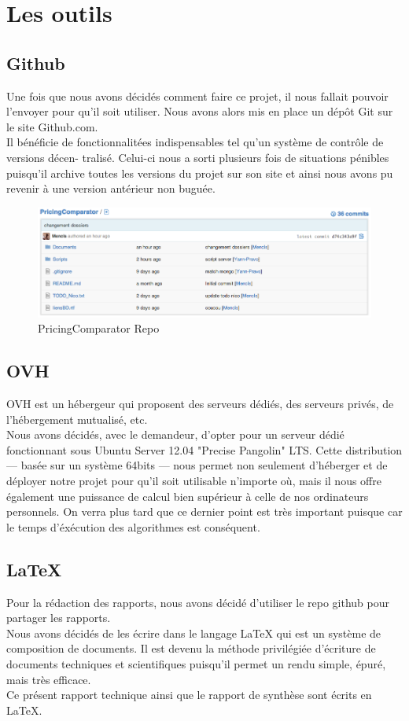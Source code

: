 \documentclass{report}
\begin{document}
\section{Les outils}
\subsection{Github}
Une fois que nous avons décidés comment faire ce projet, il nous fallait pouvoir l’envoyer pour qu’il soit utiliser. Nous avons alors mis en place un dépôt Git sur le site Github.com. \\
Il bénéficie de fonctionnalitées indispensables tel qu’un système de contrôle de versions décen- tralisé. Celui-ci nous a sorti plusieurs fois de situations pénibles puisqu’il archive toutes les versions du projet sur son site et ainsi nous avons pu revenir à une version antérieur non buguée.
\begin{figure}[h]
\includegraphics[scale = 0.5]{./img/github.png}
\caption{PricingComparator Repo}
\end{figure}

\subsection{OVH}
OVH est un hébergeur qui proposent des serveurs dédiés, des serveurs privés, de l'hébergement mutualisé, etc.\\
Nous avons décidés, avec le demandeur, d'opter pour un serveur dédié fonctionnant sous Ubuntu Server 12.04 "Precise Pangolin" LTS. Cette distribution — basée sur un système 64bits — nous permet non seulement d'héberger et de déployer notre projet pour qu'il soit utilisable n'importe où, mais il nous offre également une puissance de calcul bien supérieur à celle de nos ordinateurs personnels. On verra plus tard que ce dernier point est très important puisque car le temps d'éxécution des algorithmes est conséquent.

\subsection{LaTeX}
Pour la rédaction des rapports, nous avons décidé d'utiliser le repo github pour partager les rapports.\\
Nous avons décidés de les écrire dans le langage LaTeX qui est un système de composition de documents. Il est devenu la méthode privilégiée d'écriture de documents techniques et scientifiques puisqu'il permet un rendu simple, épuré, mais très efficace.\\
Ce présent rapport technique ainsi que le rapport de synthèse sont écrits en LaTeX.
\end{document}
